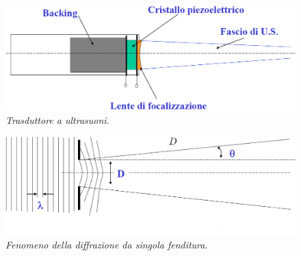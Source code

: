 \documentclass{report}
\numberwithin{equation}{section}
\numberwithin{figure}{section}
\begin{document}
\begin{figure}[htp]
\centering
\includegraphics[scale=0.63]{immagini/trasduttore.png}
\caption{\label{fig:trasduttore} \textit{Trasduttore a ultrasuoni}.}
\end{figure}

\begin{figure}[H]
\centering
\includegraphics[scale=0.63]{immagini/diffra.png}
\vspace{-20 pt}

\caption{\label{fig:diffra} \textit{Fenomeno della diffrazione da singola fenditura}.}
\end{figure}
\end{document}
